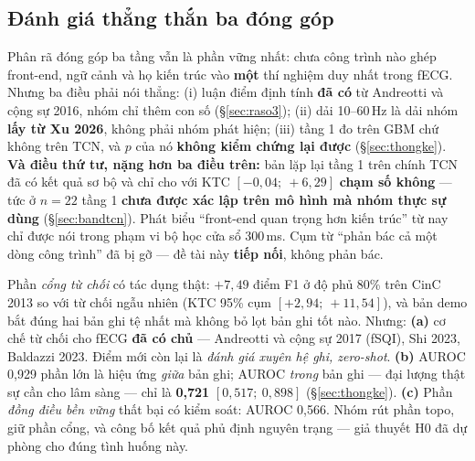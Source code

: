 \subsection{Đánh giá thẳng thắn ba đóng góp}

\begin{description}[leftmargin=2.4em,style=nextline,itemsep=6pt]

\item[C2 --- đủ mạnh, là xương sống, nhưng phải phát biểu khiêm tốn hơn.]
Phân rã đóng góp ba tầng vẫn là phần vững nhất: chưa công trình nào ghép front-end, ngữ cảnh và họ kiến
trúc vào \textbf{một} thí nghiệm duy nhất trong fECG. Nhưng ba điều phải nói thẳng:
(i) luận điểm định tính \textbf{đã có} từ Andreotti và cộng sự 2016, nhóm chỉ thêm con số
(\S\ref{sec:raso3}); (ii) dải 10--60\,Hz là dải nhóm \textbf{lấy từ Xu 2026}, không phải nhóm phát hiện;
(iii) tầng 1 đo trên GBM chứ không trên TCN, và $p$ của nó \textbf{không kiểm chứng lại được}
(\S\ref{sec:thongke}). \textbf{Và điều thứ tư, nặng hơn ba điều trên:} bản lặp lại tầng 1 trên chính
TCN đã có kết quả sơ bộ và chỉ cho  với KTC $[-0{,}04;\ +6{,}29]$ \textbf{chạm số
không} --- tức ở $n=22$ tầng 1 \textbf{chưa được xác lập trên mô hình mà nhóm thực sự dùng}
(\S\ref{sec:bandtcn}). Phát biểu ``front-end quan trọng hơn kiến trúc'' từ nay chỉ được nói trong phạm
vi bộ học cửa sổ 300\,ms. Cụm từ ``phản bác cả một dòng công trình'' đã bị gỡ --- đề tài này
\textbf{tiếp nối}, không phản bác.

\item[C3 --- đã chạy prototype; nửa khẳng định, nửa phủ định, và cơ chế không mới.]
Phần \textit{cổng từ chối} có tác dụng thật: $+7{,}49$ điểm F1 ở độ phủ 80\% trên CinC 2013 so với từ
chối ngẫu nhiên (KTC 95\% cụm $[+2{,}94;\ +11{,}54]$), và bản demo bắt đúng hai bản ghi tệ nhất mà không
bỏ lọt bản ghi tốt nào. Nhưng:
\textbf{(a)} cơ chế từ chối cho fECG \textbf{đã có chủ} --- Andreotti và cộng sự 2017 (fSQI), Shi 2023,
Baldazzi 2023. Điểm mới còn lại là \textit{đánh giá xuyên hệ ghi, zero-shot}.
\textbf{(b)} AUROC 0,929 phần lớn là hiệu ứng \textit{giữa} bản ghi; AUROC \textit{trong} bản ghi ---
đại lượng thật sự cần cho lâm sàng --- chỉ là \textbf{0,721} $[0{,}517;\ 0{,}898]$ (\S\ref{sec:thongke}).
\textbf{(c)} Phần \textit{đồng điều bền vững} thất bại có kiểm soát: AUROC 0,566. Nhóm rút phần topo,
giữ phần cổng, và công bố kết quả phủ định nguyên trạng --- giả thuyết H0 đã dự phòng cho đúng tình
huống này.


\end{description}
